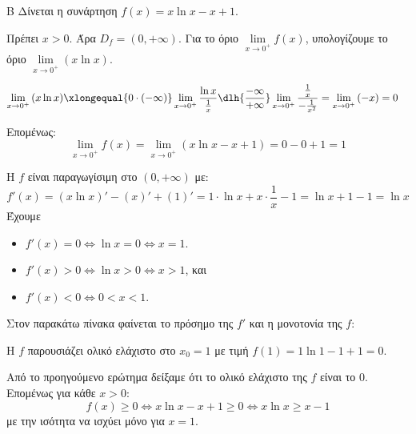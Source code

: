 \begin{thema}{Β}
Δίνεται η συνάρτηση $f(x) = x \ln x - x + 1$.

\begin{erwthma}
\item Πρέπει $x > 0$. Άρα $D_f = (0, +\infty)$.
Για το όριο $\lim\limits_{x \to 0^+} f(x)$, υπολογίζουμε το όριο $\lim\limits_{x \to 0^+} (x \ln x)$. 

\begin{align*}
\lim\limits_{x\to 0^+}{(x\ln{x})}&\xlongequal{0\cdot(-\infty)}\lim\limits_{x\to 0^+}{\frac{\ln{x}}{\frac{1}{x}}}\dlh{\frac{-\infty}{+\infty}}\lim\limits_{x\to 0^+}{\frac{\frac{1}{x}}{-\frac{1}{x^2}}}=\lim\limits_{x\to 0^+}{(-x)}=0
\end{align*}

Επομένως:
\[ \lim_{x\to0^+} f(x) = \lim_{x\to0^+} (x \ln x - x + 1) = 0 - 0 + 1 = 1 \]

\item Η $f$ είναι παραγωγίσιμη στο $(0, +\infty)$ με:
\[ f'(x) = (x\ln x)' - (x)' + (1)' =  1 \cdot \ln x + x \cdot \frac{1}{x}  - 1 = \ln x + 1 - 1 = \ln x \]
Έχουμε 
\begin{itemize}
\item $f'(x) = 0 \Leftrightarrow \ln x = 0 \Leftrightarrow x = 1$.
\item $f'(x) > 0 \Leftrightarrow \ln x > 0 \Leftrightarrow x > 1$, και 
\item $f'(x) < 0 \Leftrightarrow 0 < x < 1$.
\end{itemize}

Στον παρακάτω πίνακα φαίνεται το πρόσημο της $f'$ και η μονοτονία της $f$:
\begin{center}
\end{center}
Η $f$ παρουσιάζει ολικό ελάχιστο στο $x_0 = 1$ με τιμή $f(1) = 1\ln 1 - 1 + 1 = 0$.

\item Από το προηγούμενο ερώτημα δείξαμε ότι το ολικό ελάχιστο της $f$ είναι το $0$. Επομένως για κάθε $x > 0$:
\[ f(x) \ge 0 \Leftrightarrow x \ln x - x + 1 \ge 0 \Leftrightarrow x \ln x \ge x - 1 \]
με την ισότητα να ισχύει μόνο για $x = 1$.


\end{erwthma}
\end{thema}

